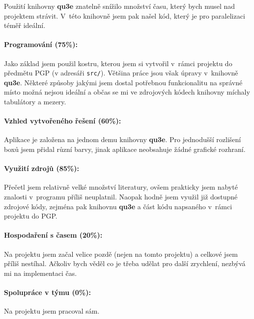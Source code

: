 \documentclass[11pt,a4paper]{article}
\begin{document}
Použití knihovny \textbf{qu3e} znatelně snížilo množství času, který bych musel
nad projektem strávit. V~této knihovně jsem pak našel kód, který je pro
paralelizaci téměř ideální.

\paragraph{Programování (75\%):}

Jako základ jsem použil kostru, kterou jsem si vytvořil v~rámci projektu do
předmětu PGP (v adresáři \texttt{src/}).
Většina práce jsou však úpravy v~knihovně \textbf{qu3e}.
Některé způsoby jakými jsem dostal potřebnou funkcionalitu na správné místo
možná nejsou ideální a občas se mi ve zdrojových kódech knihovny míchaly tabulátory
a mezery.

\paragraph{Vzhled vytvořeného řešení (60\%):}

Aplikace je založena na jednom demu knihovny \textbf{qu3e}.
Pro jednodušší rozlišení boxů jsem přidal různí barvy, jinak aplikace
neobsahuje žádné grafické rozhraní.

\paragraph{Využití zdrojů (85\%):}

Přečetl jsem relativně velké množství literatury, ovšem prakticky jsem
nabyté znalosti v~programu příliš neuplatnil.
Naopak hodně jsem využil již dostupné zdrojové kódy, zejména pak
knihovnu \textbf{qu3e} a část kódu napsaného v~rámci projektu do PGP.

\paragraph{Hospodaření s časem (20\%):}

Na projektu jsem začal velice pozdě (nejen na tomto projektu) a celkové jsem
příliš nestíhal. Ačkoliv bych věděl co je třeba udělat pro další zrychlení,
nezbývá mi na implementaci čas.

\paragraph{Spolupráce v týmu (0\%):}

Na projektu jsem pracoval sám.
\end{document}
